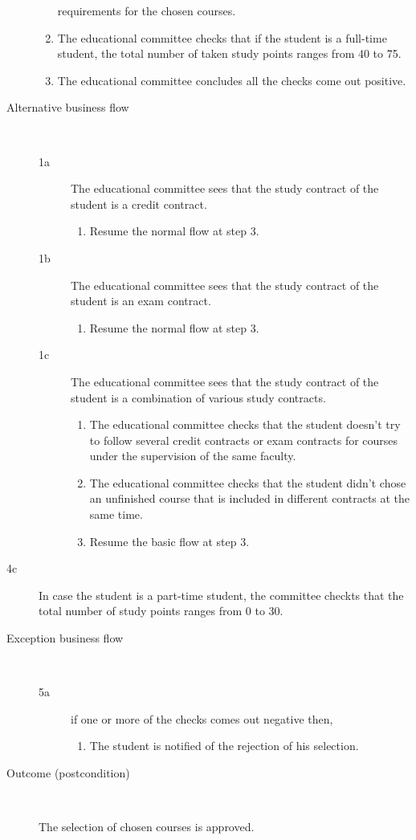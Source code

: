 \begin{description}
\begin{enumerate}
	  	requirements for the chosen courses.
	  	\item The educational committee checks that if the student is a full-time
	  	student, the total number of taken study points ranges from 40 to 75. 
	  	\item The educational committee concludes all the checks come out positive.
	\end{enumerate}
	\item[Alternative business flow] \
		\begin{description}
		\item[1a] The educational committee sees that the study contract of the
		student is a credit contract. 
			\begin{enumerate}
			  \item Resume the normal flow at step 3.
			\end{enumerate}
		\item[1b] The educational committee sees that the study contract of the
		student is an exam contract. 
			\begin{enumerate}
			  \item Resume the normal flow at step 3.
			\end{enumerate}
		\item[1c] The educational committee sees that the study contract of the
		student is a combination of various study contracts.
			\begin{enumerate}
			  \item The educational committee checks that the student doesn't try to
			  follow several credit contracts or exam contracts for courses under the
			  supervision of the same faculty.
			  \item The educational committee checks that the student didn't chose
			  an unfinished course that is included in different contracts at the same
			  time.
			  \item Resume the basic flow at step 3.
			\end{enumerate}
		\end{description}
		\item[4c] In case the student is a part-time student, the committee checkts
		that the total number of study points ranges from 0 to 30.
	\item[Exception business flow] \ 
	\begin{description}
		\item[5a] if one or more of the checks comes out negative then,
		\begin{enumerate}
		  \item The student is notified of the rejection of his selection.
		\end{enumerate}
	\end{description}
	\item[Outcome (postcondition)] \ 
		\par The selection of chosen courses is approved.
\end{description}
